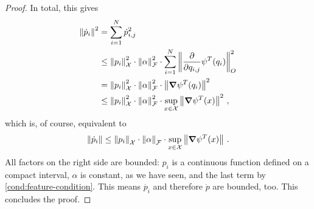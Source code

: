 \begin{proof}
	In total, this gives
	\begin{align}
		\norm{\dot{p}_i}^2 &= \sum_{i=1}^N \dot{p}_{i,j}^2\\
		&\leq \norm{p_i}_{\mathcal{X}}^2 \cdot \norm{\alpha }_{\mathcal{F}}^2 \cdot \sum_{i=1}^N  \norm{\frac{\partial}{\partial q_{i, j}} \psi^T(q_i)}_O^2\\
		& = \norm{p_i}_{\mathcal{X}}^2 \cdot \norm{\alpha }_{\mathcal{F}}^2 \cdot \norm{\grad \psi^T(q_i)}^2 \\
		& \leq \norm{p_i}_{\mathcal{X}}^2 \cdot \norm{\alpha }_{\mathcal{F}}^2 \cdot \sup_{x \in \mathcal{X}}\norm{\grad \psi^T(x)}^2 \ ,
	\end{align}
	which is, of course, equivalent to 
	\begin{equation}
	\label{eq:norm-p-inequality}
		\norm{\dot{p}_i}\leq \norm{p_i}_{\mathcal{X}} \cdot \norm{\alpha }_{\mathcal{F}} \cdot \sup_{x \in \mathcal{X}}\norm{\grad \psi^T(x)} \ .
	\end{equation}
	All factors on the right side are bounded: $p_i$ is a continuous function defined on a compact interval, $\alpha$ is constant, as we have seen, and the last term by \cref{cond:feature-condition}.
	This means $\dot{p_i}$ and therefore $\dot{p}$ are bounded, too.
	This concludes the proof.
\end{proof}